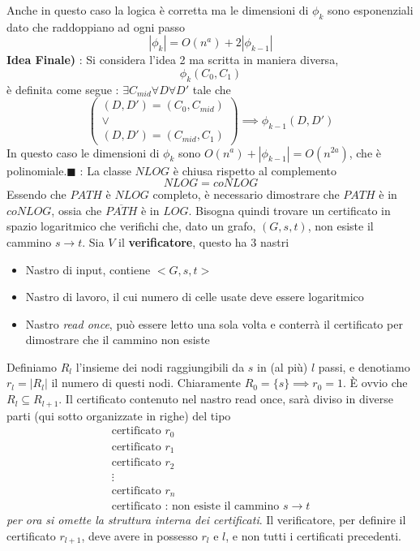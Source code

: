 \documentclass[10pt, letterpaper]{report}
\begin{document}
Anche in questo caso la logica è corretta ma le dimensioni di $\phi_k$ sono esponenziali dato che raddoppiano ad ogni passo $$|\phi_k|=O(n^a)+2|\phi_{k-1}|$$\acc
\textbf{Idea Finale)} : Si considera l'idea 2 ma scritta in maniera diversa,  
$$\phi_k(C_0,C_1) $$ è definita come segue : $\exists C_{mid}\forall D\forall D'$ tale che 
$$ \begin{pmatrix}
    (D,D')=(C_0,C_{mid})\\ \lor \\ 
    (D,D')=(C_{mid},C_1)
\end{pmatrix}\implies \phi_{k-1}(D,D')$$
In questo caso le dimensioni di $\phi_k$ sono $O(n^a)+|\phi_{k-1}|=O(n^{2a})$, che è polinomiale.\hfill$\blacksquare$\acc 
{}: La classe $NLOG$ è chiusa rispetto al complemento $$NLOG=coNLOG$$\dimo{}
Essendo che $PATH$ è $NLOG$ completo, è necessario dimostrare che $PATH$ è in $coNLOG$, ossia che $\overline{PATH}$ è in $LOG$.\acc 
Bisogna quindi trovare un certificato in spazio logaritmico che verifichi che, dato un grafo, $(G,s,t)$, non esiste il cammino $s\longrightarrow t$. \acc 
Sia $V$ il \textbf{verificatore}, questo ha 3 nastri\begin{itemize}
    \item Nastro di input, contiene $<G,s,t>$
    \item Nastro di lavoro, il cui numero di celle usate deve essere logaritmico
    \item Nastro \textit{read once}, può essere letto una sola volta e conterrà il certificato per dimostrare che il cammino non esiste 
\end{itemize}
Definiamo $R_l$ l'insieme dei nodi raggiungibili da $s$ in (al più) $l$ passi, e denotiamo $r_l=|R_l|$ il numero di questi nodi. Chiaramente $R_0=\{s\}\implies r_0=1$. È ovvio che $R_l\subseteq R_{l+1}$.\acc 
Il certificato contenuto nel nastro read once, sarà diviso in diverse parti (qui sotto organizzate in righe) del tipo $$\begin{matrix}
    \text{certificato }r_0\\ 
    \text{certificato }r_1\\ 
    \text{certificato }r_2\\ 
    \vdots \\ 
    \text{certificato }r_n \\ 
    \text{certificato : non esiste il cammino }s\longrightarrow t
\end{matrix}$$
\textit{per ora si omette la struttura interna dei certificati}. \acc
Il verificatore, per definire il certificato $r_{l+1}$, deve avere in possesso $r_l$ e $l$, e non tutti i certificati precedenti.\\
\flowerLine 
\end{document}
